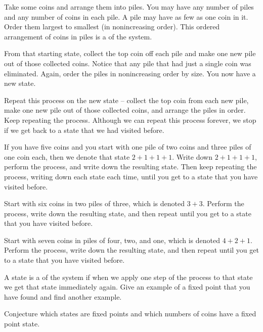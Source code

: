 \begin{act}
\label{act_bulg_sol}   
    Take some coins and arrange them into piles. You may have any number of piles and any number of coins in each pile.  A pile may have as few as one coin in it. Order them largest to smallest (in nonincreasing order).  This ordered arrangement of coins in piles is a  of the system.

    From that starting state, collect the top coin off each pile and make one new pile out of those collected coins.  Notice that any pile that had just a single coin was eliminated.  Again, order the piles in nonincreasing order by size. You now have a new state. 

    Repeat this process on the new state -- collect the top coin from each new pile, make one new pile out of those collected coins, and arrange the piles in order.  Keep repeating the process.
    Although we can repeat this process forever, we stop if we get back to a state that we had visited before. 

        \begin{actpart}
            \item If you have five coins and you start with one pile of two coins and three piles of one coin each, then we denote that state $2+1+1+1$. Write down $2+1+1+1$, perform the process, and write down the resulting state.  Then keep repeating the process, writing down each state each time, until you get to a state that you have visited before.

            \item Start with six coins in two piles of three, which is denoted $3+3$.  Perform the process, write down the resulting state, and then repeat until you get to a state that you have visited before.

            \item Start with seven coins in piles of four, two, and one, which is denoted $4+2+1$.  Perform the process, write down the resulting state, and then repeat until you get to a state that you have visited before.

            \item A state is a  of the system if when we apply one step of the process to that state we get that state immediately again. Give an example of a fixed point that you have found and find another example.

            \item \label{part_bulg_sol_fixed} Conjecture which states are fixed points and which numbers of coins have a fixed point state.


\end{actpart}
\end{act}
